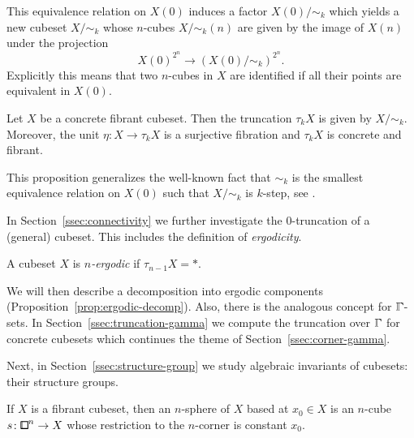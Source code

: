This equivalence relation on $X(0)$ induces a factor $X(0)/\sim_k$
which yields a new cubeset $X/\sim_k$ whose $n$-cubes $X/\sim_k(n)$ are given by the image of $X(n)$ under the projection
\[
    X(0)^{2^n}\to (X(0)/\sim_k)^{2^n}.
\]
Explicitly this means that two $n$-cubes in $X$ are identified if all their points are equivalent in $X(0)$.

\begin{proposition*}
Let $X$ be a concrete fibrant cubeset.
Then the truncation $\tau_k X$ is given by $X/\sim_k$.
Moreover, the unit $\eta\colon X\to\tau_k X$ is a surjective fibration
and $\tau_k X$ is concrete and fibrant.
\end{proposition*}

This proposition generalizes the well-known fact that $\sim_k$ is the smallest equivalence relation
on $X(0)$ such that $X/\sim_k$ is $k$-step, see \cite[Proposition 6.3]{Gutman2020}.

In Section~\ref{ssec:connectivity} we further investigate the $0$-truncation of a (general) cubeset.
This includes the definition of \emph{ergodicity}.

\begin{definition*}
A cubeset $X$ is \emph{$n$-ergodic} if $\tau_{n-1}X = \ast$.
\end{definition*}

We will then describe a decomposition into ergodic components (Proposition~\ref{prop:ergodic-decomp}).
Also, there is the analogous concept for $\bbGamma$-sets.
In Section~\ref{ssec:truncation-gamma} we compute the truncation over $\bbGamma$
for concrete cubesets which continues the theme of Section~\ref{ssec:corner-gamma}.

Next, in Section~\ref{ssec:structure-group} we study algebraic invariants of cubesets:
their structure groups.

\begin{definition*}
If $X$ is a fibrant cubeset, then an $n$-sphere of $X$ based at $x_0\in X$
is an $n$-cube $s\colon{\bbox}^n\to X$ whose restriction to the $n$-corner is constant $x_0$.
\end{definition*}

